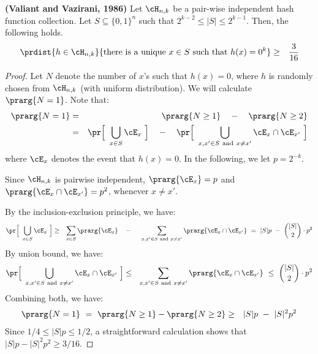 \documentclass[11pt, a4paper]{article}
\begin{document}
\begin{lemma}
\label{lem:valiant-vazirani}
{\bf (Valiant and Vazirani, 1986)}
Let $\cH_{n,k}$ be a pair-wise independent hash function collection.
Let $S\subseteq \{0,1\}^n$ such that $2^{k-2}\leq |S|\leq 2^{k-1}$.
Then, the following holds.
\begin{eqnarray*}
\prdist {h \in \cH_{n,k}} {\textup{there is a unique}\ x \in S\ \textup{such that}\ h(x)=0^k} & \geq & \frac{3}{16}
\end{eqnarray*}
\end{lemma}
\begin{proof}
Let $N$ denote the number of $x$'s such that $h(x)=0$,
where $h$ is randomly chosen from $\cH_{n,k}$ (with uniform distribution).
We will calculate $\prarg {N=1}$.
Note that:
\begin{eqnarray*}
\prarg {N=1} & = & \prarg {N\geq 1} \quad - \quad \prarg {N\geq 2}
\\
& = &
\pr \Big[\ \bigcup_{x\in S} \cE_x\ \Big] \quad - \quad
\pr \Big[\ \bigcup_{x,x'\in S \ \text{and}\ x\neq x'} \cE_{x}\cap \cE_{x'}\ \Big]
\end{eqnarray*}
where $\cE_x$ denotes the event that $h(x)=0$.
In the following, we let $p = 2^{-k}$.

Since $\cH_{n,k}$ is pairwise independent, 
$\prarg {\cE_x}=p$ and $\prarg {\cE_x \cap \cE_{x'}}=p^2$, whenever $x\neq x'$.

By the inclusion-exclusion principle, we have:
\begin{eqnarray*}
\pr \Big[\ \bigcup_{x\in S} \cE_x\ \Big]
& \geq & 
\sum_{x\in S} \prarg{\cE_x} \quad - \quad
\
\sum_{x,x'\in S \ \text{and}\ x\neq x'} \prarg {\cE_{x}\cap \cE_{x'}}
\ = \
|S|p \ - \ {|S| \choose 2}\cdot p^2
\end{eqnarray*}
By union bound, we have:
\begin{eqnarray*}
\pr \Big[\ \bigcup_{x,x'\in S \ \text{and}\ x\neq x'} \cE_{x}\cap \cE_{x'}\ \Big]
& \leq & 
\sum_{x,x'\in S \ \text{and}\ x\neq x'} \prarg{\cE_{x}\cap\cE_{x'}}
\ \leq \
{|S| \choose 2}\cdot p^2
\end{eqnarray*}
Combining both, we have:
\begin{eqnarray*}
\prarg{N=1} \ = \
\prarg{N\geq 1} - \prarg{N\geq 2}
& \geq &
|S|p\ - \
|S|^2p^2 
\end{eqnarray*}
Since $1/4 \leq |S|p \leq 1/2$,
a straightforward calculation shows that $|S|p - |S|^2p^2 \geq 3/16$.
\end{proof}
\end{document}
